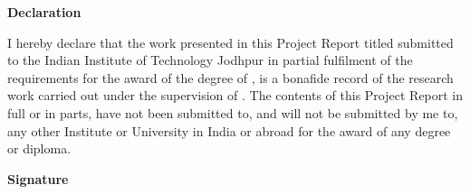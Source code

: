 \myemptypage
\begin{flushright}
\huge{\textbf{Declaration}}
\end{flushright}
I hereby declare that the work presented in this Project Report titled \ttitle{} submitted to the Indian Institute of Technology Jodhpur in partial fulfilment of the requirements for the award of the degree of \degree, is a bonafide record of the research work carried out under the supervision of \supname. The contents of this Project Report in full or in parts, have not been submitted to, and will not be submitted by me to, any other Institute or University in India or abroad for the award of any degree or diploma.
\vspace{2cm}
\begin{flushright}
\large{\textbf{Signature}}\\
\emph{\authorname}\\
\rn
\end{flushright}
